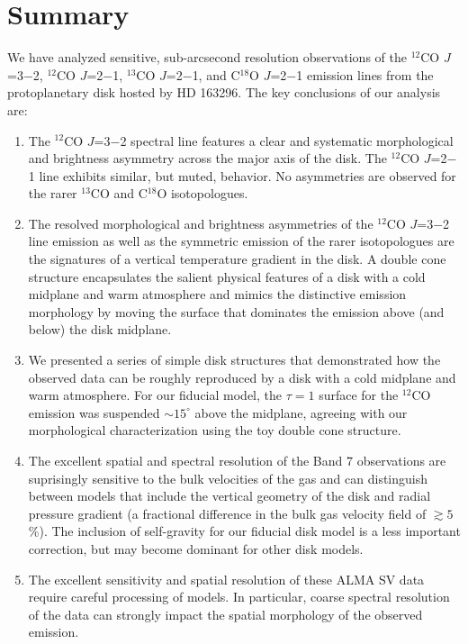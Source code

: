 \section{Summary}\label{sec:summary}
We have analyzed sensitive, sub-arcsecond resolution observations of
the $^{12}$CO $J$=3$-$2, $^{12}$CO $J$=2$-$1, $^{13}$CO $J$=2$-$1, and 
C$^{18}$O $J$=2$-$1 emission lines from the protoplanetary disk hosted by HD 
163296.  The key conclusions of our analysis are:
\begin{enumerate}
\item The $^{12}$CO $J$=3$-$2 spectral line features a clear and systematic
morphological and brightness asymmetry across the major axis of the disk.  The 
$^{12}$CO $J$=2$-$1 line exhibits similar, but muted, behavior.  No asymmetries
are observed for the rarer $^{13}$CO and C$^{18}$O isotopologues.
\item  The resolved morphological and brightness asymmetries of the 
$^{12}$CO $J$=3$-$2 line emission as well as the symmetric emission of the 
rarer isotopologues are the signatures of a vertical temperature gradient in the
disk.  A double cone structure encapsulates the salient physical features of a 
disk with a cold midplane and warm atmosphere and mimics the distinctive
emission morphology by moving the surface that dominates the emission above 
(and below) the disk midplane.
\item We presented a series of simple disk structures that demonstrated how the
observed data can be roughly reproduced by a disk with a cold midplane and 
warm atmosphere.  For our fiducial model, the $\tau=1$ surface for the 
$^{12}$CO emission was suspended $\sim 15^\circ$ above the midplane, agreeing 
with our morphological characterization using the toy double cone structure.
\item The excellent spatial and spectral resolution of the Band 7 observations
are suprisingly sensitive to the bulk velocities of the gas and can distinguish 
between models that include the vertical geometry of the disk
and radial pressure gradient (a fractional difference in the bulk gas velocity 
field of $\gtrsim 5$\%).  The inclusion of self-gravity for our fiducial disk 
model is a less important correction, but may become dominant for other disk 
models.
\item  The excellent sensitivity and spatial resolution of these ALMA SV data
require careful processing of models.  In particular, coarse spectral 
resolution of the data can strongly impact the spatial morphology of the 
observed emission.
\end{enumerate}

